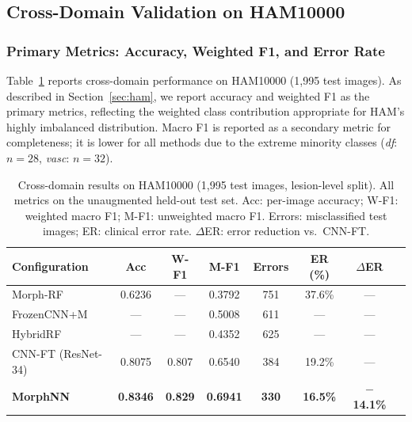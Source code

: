 \documentclass[preprint,12pt]{elsarticle}
\begin{document}
\subsection{Cross-Domain Validation on HAM10000}
\label{sec:ham_results}

\subsubsection{Primary Metrics: Accuracy, Weighted F1, and Error Rate}

Table~\ref{tab:ham_results} reports cross-domain performance on HAM10000
(1,995 test images).  As described in Section~\ref{sec:ham}, we report
accuracy and weighted F1 as the primary metrics, reflecting the
weighted class contribution appropriate for HAM's highly imbalanced
distribution.  Macro F1 is reported as a secondary metric for
completeness; it is lower for all methods due to the extreme minority
classes (\textit{df}: $n=28$, \textit{vasc}: $n=32$).

\begin{table}[htbp]
\centering
\caption{Cross-domain results on HAM10000 (1,995 test images, lesion-level split).
  All metrics on the unaug\-mented held-out test set.
  Acc: per-image accuracy; W-F1: weighted macro F1; M-F1: unweighted macro F1.
  Errors: misclassified test images; ER: clinical error rate.
  $\Delta$ER: error reduction vs.\ CNN-FT.}
\label{tab:ham_results}
\setlength{\tabcolsep}{4.5pt}
\renewcommand{\arraystretch}{1.12}
\begin{tabular}{lccccccc}
\toprule
\textbf{Configuration} &
  \textbf{Acc} & \textbf{W-F1} & \textbf{M-F1} &
  \textbf{Errors} & \textbf{ER (\%)} & \textbf{$\Delta$ER} \\
\midrule
Morph-RF    & 0.6236 & --- & 0.3792 & 751 & 37.6\% & --- \\
FrozenCNN+M & --- & --- & 0.5008 & 611 & --- & --- \\
HybridRF    & --- & --- & 0.4352 & 625 & --- & --- \\
CNN-FT (ResNet-34)
            & 0.8075 & 0.807 & 0.6540 & 384 & 19.2\% & --- \\
\midrule
\textbf{MorphNN}
            & \textbf{0.8346} & \textbf{0.829} & \textbf{0.6941} &
            \textbf{330} & \textbf{16.5\%} & $-$\textbf{14.1\%} \\
\bottomrule
\end{tabular}
\end{table}
\end{document}
